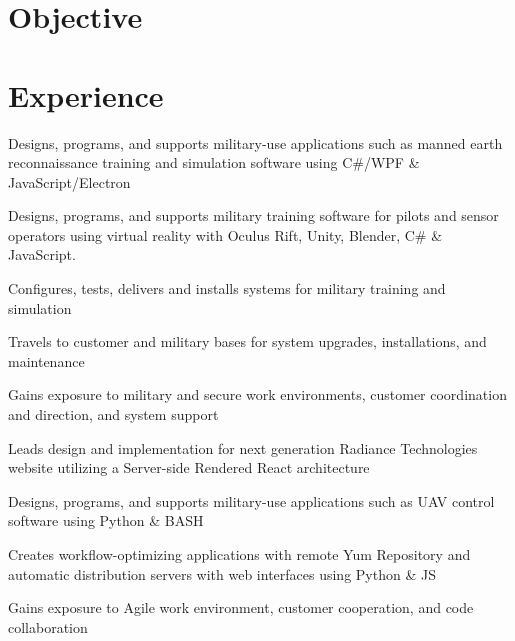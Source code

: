 \documentclass[]{resume}
\begin{document}
\begin{minipage}[t]{0.66\textwidth}

\section{Objective}
\sectionsep


\section{Experience}

\vspace{\topsep} %
\begin{tightemize}
\item Designs, programs, and supports military-use applications such as manned earth reconnaissance training and simulation software using C\#/WPF \& JavaScript/Electron
\item Designs, programs, and supports military training software for pilots and sensor operators using virtual reality with Oculus Rift, Unity, Blender, C\# \& JavaScript.
\item Configures, tests, delivers and installs systems for military training and simulation
\item Travels to customer and military bases for system upgrades, installations, and maintenance
\item Gains exposure to military and secure work environments, customer coordination and direction, and system support
\item Leads design and implementation for next generation Radiance Technologies website utilizing a Server-side Rendered React architecture
\end{tightemize}

\sectionsep

\begin{tightemize}
\item Designs, programs, and supports military-use applications such as UAV control software using Python \& BASH
\item Creates workflow-optimizing applications with remote Yum Repository and automatic distribution servers with web interfaces using Python \& JS
\item Gains exposure to Agile work environment, customer cooperation, and code collaboration
\end{tightemize}


\end{minipage}
\end{document}

